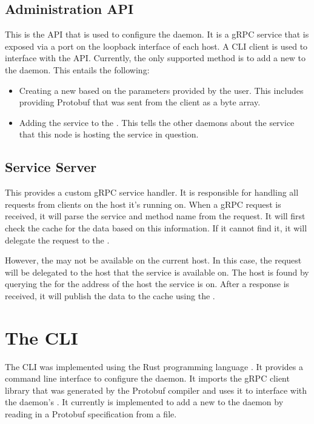 \documentclass[a4paper,12pt]{report}
\begin{document}
\subsection{Administration API}
\label{sec:api}
This is the API that is used to configure the daemon. It is a gRPC service that is exposed via a port on the loopback interface of each host.
A CLI client is used to interface with the API. Currently, the only supported method is to add a new \textit{} to the daemon.
This entails the following:
\begin{itemize}
    \item Creating a new \textit{} based on the parameters provided by the user.
          This includes providing Protobuf that was sent from the client as a byte array.
    \item Adding the service to the \textit{}. This tells the other daemons about the service that this
          node is hosting the service in question.
\end{itemize}

\subsection{Service Server}
\label{sec:server}
This provides a custom gRPC service handler. It is responsible for handling all requests from clients on the host it's running on.
When a gRPC request is received, it will parse the service and method name from the request.
It will first check the cache for the data based on this information. If it cannot find it,
it will delegate the request to the \textit{}.

However, the \textit{} may not be available on the current host. In this case, the request will be delegated to the host that the
service is available on. The host is found by querying the \textit{} for the address of the host the service is on.
After a response is received, it will publish the data to the cache using the \textit{}.

\section{The CLI}
\label{sec:cli}
The CLI was implemented using the Rust programming language \cite{rust}.
It provides a command line interface to configure the daemon.
It imports the gRPC client library that was generated by the Protobuf compiler and uses it to interface with the daemon's \textit{}.
It currently is implemented to add a new \textit{} to the daemon by reading in a Protobuf specification from a file.
\end{document}
